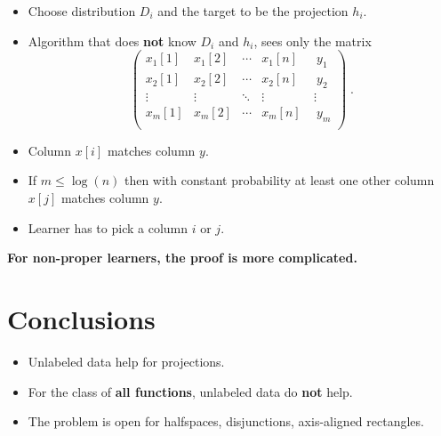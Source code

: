 \documentclass[30pt,landscape]{sciposter}
\begin{document}
\begin{multicols}{3}
\begin{itemize}
\item Choose distribution $D_i$ and the target to be the projection $h_i$.

\item Algorithm that does \textbf{not} know $D_i$ and $h_i$, sees only the matrix
$$
\left(
\begin{array}{cccc|c}
x_{1}[1] & x_{1}[2] & \cdots & x_{1}[n] \  & \ y_1 \\
x_{2}[1] & x_{2}[2] & \cdots & x_{2}[n] \ & \ y_2 \\
\vdots & \vdots & \ddots & \vdots \ & \vdots \\
x_{m}[1] & x_{m}[2] & \cdots & x_{m}[n] \ & \ y_m \\
\end{array}
\right) \; .
$$

\item Column $x[i]$ matches column $y$.

\item If $m \le \log(n)$ then with constant probability at least one other column $x[j]$
matches column $y$.

\item Learner has to pick a column $i$ or $j$.
\end{itemize}

\vspace{1cm}

\textbf{For non-proper learners, the proof is more complicated.}

\section*{Conclusions}

\begin{itemize}
\item Unlabeled data help for projections.
\item For the class of \textbf{all functions}, unlabeled data do \textbf{not} help.
\item The problem is open for halfspaces, disjunctions, axis-aligned rectangles.
\end{itemize}


\nocite{Benedek-Itai-1991,Ben-David-Lu-Pal-2008,Darnstadt-Simon-Szorenyi-2013,Hanneke-2016}




\end{multicols}
\end{document}
